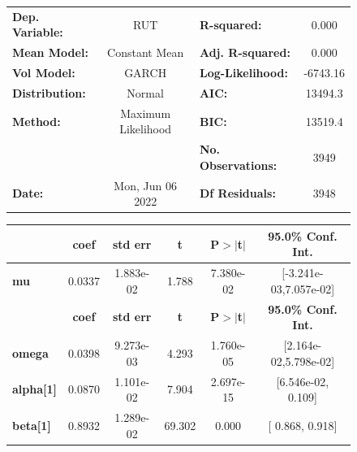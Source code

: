 \documentclass[a4paper, oneside]{discothesis}
\begin{document}
\begin{figure}
\begin{multicols}{2}
{  
\begin{center}
\begin{tabular}{lclc}
\toprule
\textbf{Dep. Variable:} &         RUT        & \textbf{  R-squared:         } &     0.000   \\
\textbf{Mean Model:}    &   Constant Mean    & \textbf{  Adj. R-squared:    } &     0.000   \\
\textbf{Vol Model:}     &       GARCH        & \textbf{  Log-Likelihood:    } &   -6743.16  \\
\textbf{Distribution:}  &       Normal       & \textbf{  AIC:               } &    13494.3  \\
\textbf{Method:}        & Maximum Likelihood & \textbf{  BIC:               } &    13519.4  \\
\textbf{}               &                    & \textbf{  No. Observations:  } &    3949     \\
\textbf{Date:}          &  Mon, Jun 06 2022  & \textbf{  Df Residuals:      } &    3948     \\
\bottomrule
\end{tabular}
\begin{tabular}{lccccc}
            & \textbf{coef} & \textbf{std err} & \textbf{t} & \textbf{P$> |$t$|$} & \textbf{95.0\% Conf. Int.}  \\
\midrule
\textbf{mu} &       0.0337  &    1.883e-02     &     1.788  &      7.380e-02       &   [-3.241e-03,7.057e-02]    \\
                  & \textbf{coef} & \textbf{std err} & \textbf{t} & \textbf{P$> |$t$|$} & \textbf{95.0\% Conf. Int.}  \\
\midrule
\textbf{omega}    &       0.0398  &    9.273e-03     &     4.293  &      1.760e-05       &   [2.164e-02,5.798e-02]     \\
\textbf{alpha[1]} &       0.0870  &    1.101e-02     &     7.904  &      2.697e-15       &    [6.546e-02,  0.109]      \\
\textbf{beta[1]}  &       0.8932  &    1.289e-02     &    69.302  &        0.000         &     [  0.868,  0.918]       \\
\bottomrule
\end{tabular}
\end{center}

}
\end{multicols}
\end{figure}
\end{document}
